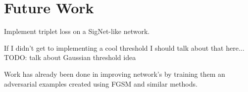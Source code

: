 \section{Future Work}\label{sec:future_work}
Implement triplet loss on a SigNet-like network.

If I didn't get to implementing a cool threshold I should talk about that here...
TODO: talk about Gaussian threshold idea

Work has already been done in improving network's by training them an adversarial examples created using FGSM and similar methods.
